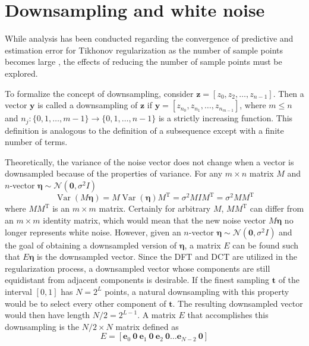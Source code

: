 \documentclass[12pt,notitlepage]{report}
\newcommand{\tVec}{\mathbf{t}}	%
\newcommand{\trans}{\mathrm{T}}	%
\newcommand{\noise}{\eta}	%
\newcommand{\noiseSD}{\sigma}	%
\newcommand{\noiseVec}{\bm{\noise}}	%
\DeclareMathOperator{\Var}{Var}	%
\begin{document}
\section{Downsampling and white noise} \label{sec:Downsampling and white noise}
While analysis has been conducted regarding the convergence of predictive and estimation error for Tikhonov regularization as the number of sample points becomes large \cite[p.~109-126]{Vogel:2002}, the effects of reducing the number of sample points must be explored. \par  
To formalize the concept of downsampling, consider $\mathbf{z} = [z_0,z_2,\ldots,z_{n-1}]$. Then a vector $\mathbf{y}$ is called a downsampling of $\mathbf{z}$ if $\mathbf{y} = [z_{n_0},z_{n_1},\ldots,z_{n_{m-1}}]$, where $m \leq n$ and $n_j:\{0,1,\ldots,{m-1}\}\rightarrow\{0,1,\ldots,{n-1}\}$ is a strictly increasing function. This definition is analogous to the definition of a subsequence except with a finite number of terms. \par
Theoretically, the variance of the noise vector does not change when a vector is downsampled because of the properties of variance. For any $m\times n$ matrix $M$ and $n$-vector $\noiseVec \sim \mathcal{N}(\bm{0},\noiseSD^2I)$
\begin{equation}
\Var(M\noiseVec) = M\Var(\noiseVec)M^{\trans} = \noiseSD^2MIM^{\trans} = \noiseSD^2MM^{\trans}
\label{eq:VarProp}
\end{equation}
where $MM^\trans$ is an $m \times m$ matrix. Certainly for arbitrary $M$, $MM^\trans$ can differ from an $m \times m$ identity matrix, which would mean that the new noise vector $M\noiseVec$ no longer represents white noise. However, given an $n$-vector $\noiseVec \sim \mathcal{N}(\bm{0},\noiseSD^2I)$ and the goal of obtaining a downsampled version of $\noiseVec$, a matrix $E$ can be found such that $E\noiseVec$ is the downsampled vector. Since the DFT and DCT are utilized in the regularization process, a downsampled vector whose components are still equidistant from adjacent components is desirable. If the finest sampling $\tVec$ of the interval $[0,1]$ has $N = 2^L$ points, a natural downsampling with this property would be to select every other component of $\tVec$. The resulting downsampled vector would then have length $N/2 = 2^{L-1}$. A matrix $E$ that accomplishes this downsampling is the $N/2 \times N$ matrix defined as
\begin{equation}
E = [\mathbf{e}_0 \: \mathbf{0} \: \mathbf{e}_1 \: \mathbf{0} \: \mathbf{e}_2 \: \mathbf{0} \ldots \mathbf{e}_{N-2} \: \mathbf{0}]
\label{eq:Downsampling matrix}
\end{equation}
\end{document}
